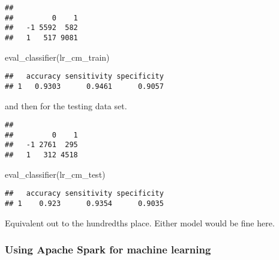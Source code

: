 \documentclass[
]{book}
\newenvironment{Shaded}{\begin{snugshade}}{\end{snugshade}}
\newcommand{\AttributeTok}[1]{\textcolor[rgb]{0.77,0.63,0.00}{#1}}
\newcommand{\FunctionTok}[1]{\textcolor[rgb]{0.00,0.00,0.00}{#1}}
\newcommand{\NormalTok}[1]{#1}
\newcommand{\OtherTok}[1]{\textcolor[rgb]{0.56,0.35,0.01}{#1}}
\newcommand{\SpecialCharTok}[1]{\textcolor[rgb]{0.00,0.00,0.00}{#1}}
\newcommand{\StringTok}[1]{\textcolor[rgb]{0.31,0.60,0.02}{#1}}
\begin{document}
\begin{verbatim}
##     
##         0    1
##   -1 5592  582
##   1   517 9081
\end{verbatim}

\begin{Shaded}
\begin{Highlighting}[]
\FunctionTok{eval\_classifier}\NormalTok{(lr\_cm\_train)}
\end{Highlighting}
\end{Shaded}

\begin{verbatim}
##   accuracy sensitivity specificity
## 1   0.9303      0.9461      0.9057
\end{verbatim}

and then for the testing data set.

\begin{Shaded}
\end{Shaded}

\begin{verbatim}
##     
##         0    1
##   -1 2761  295
##   1   312 4518
\end{verbatim}

\begin{Shaded}
\begin{Highlighting}[]
\FunctionTok{eval\_classifier}\NormalTok{(lr\_cm\_test)}
\end{Highlighting}
\end{Shaded}

\begin{verbatim}
##   accuracy sensitivity specificity
## 1    0.923      0.9354      0.9035
\end{verbatim}

Equivalent out to the hundredths place. Either model would be fine here.

\hypertarget{using-apache-spark-for-machine-learning}{%
\subsubsection{Using Apache Spark for machine learning}\label{using-apache-spark-for-machine-learning}}
\end{document}
